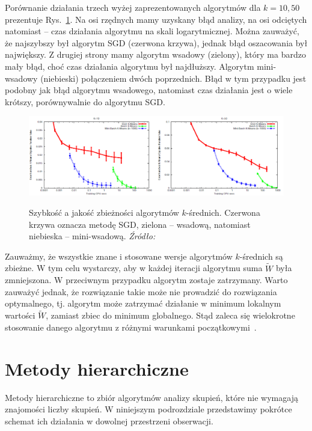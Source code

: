 \documentclass{praca1}
\begin{document}
Porównanie działania trzech wyżej zaprezentowanych algorytmów dla $k=10, 50$ prezentuje Rys.~\ref{plot:000}. Na osi rzędnych mamy uzyskany błąd analizy, na osi odciętych natomiast -- czas działania algorytmu na skali logarytmicznej. Można zauważyć, że najszybszy był algorytm SGD (czerwona krzywa), jednak błąd oszacowania był największy. Z drugiej strony mamy algorytm wsadowy (zielony), który ma bardzo mały błąd, choć czas działania algorytmu był najdłuższy. Algorytm mini-wsadowy (niebieski) połączeniem dwóch poprzednich. Błąd w tym przypadku jest podobny jak błąd algorytmu wsadowego, natomiast czas działania jest o wiele krótszy, porównywalnie do algorytmu SGD. 

\begin{figure}[!h]
  \centering
  \includegraphics[width=450pt]{plot0.png}\\
  \caption{Szybkość a jakość zbieżności algorytmów $k$-średnich. Czerwona krzywa oznacza metodę SGD, zielona -- wsadową, natomiast niebieska -- mini-wsadową. \emph{Źródło:}~\cite{Sculley2010:webkmeans}}\label{plot:000}
\end{figure}


Zauważmy, że wszystkie znane i stosowane wersje algorytmów $k$-średnich są zbieżne. W tym celu wystarczy, aby w każdej iteracji algorytmu suma $\widetilde{W}$ była zmniejszona. W przeciwnym przypadku algorytm zostaje zatrzymany. Warto zauważyć jednak, że rozwiązanie takie może nie prowadzić do rozwiązania optymalnego, tj. algorytm może zatrzymać działanie w minimum lokalnym wartości $\widetilde{W}$, zamiast zbiec do minimum globalnego. Stąd zaleca się wielokrotne stosowanie danego algorytmu z różnymi warunkami początkowymi~\cite{Koronacki2005:statystyczne}.


\section{Metody hierarchiczne}

Metody hierarchiczne to zbiór algorytmów analizy skupień, które nie wymagają znajomości liczby skupień. W niniejszym podrozdziale przedstawimy pokrótce schemat ich działania w dowolnej przestrzeni obserwacji.
\end{document}
